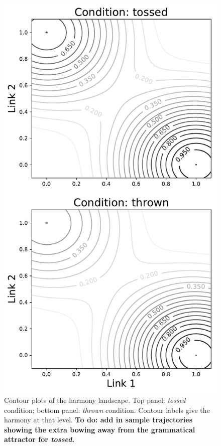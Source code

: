 \documentclass[10pt,letterpaper]{article}
\begin{document}
\begin{figure}[h!]
\includegraphics[width=\linewidth]{../Model/HarmonyContours.pdf}
\caption{Contour plots of the harmony landscape. Top panel: \emph{tossed} condition; bottom panel: \emph{thrown} condition. Contour labels give the harmony at that level. \textbf{To do: add in sample trajectories showing the extra bowing away from the grammatical attractor for \emph{tossed}.}}
\label{harmonylandscape}
\end{figure}
\end{document}
